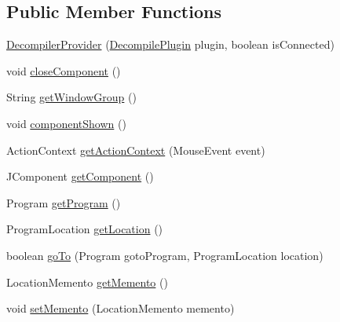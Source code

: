 \subsection*{Public Member Functions}
\begin{DoxyCompactItemize}
\item 
\mbox{\hyperlink{classghidra_1_1app_1_1plugin_1_1core_1_1decompile_1_1_decompiler_provider_abceef9c1daf26284a5931d893fea0683}{Decompiler\+Provider}} (\mbox{\hyperlink{classghidra_1_1app_1_1plugin_1_1core_1_1decompile_1_1_decompile_plugin}{Decompile\+Plugin}} plugin, boolean is\+Connected)
\item 
void \mbox{\hyperlink{classghidra_1_1app_1_1plugin_1_1core_1_1decompile_1_1_decompiler_provider_a0e2fcd2b85d7ae6fe189998b4bcdd984}{close\+Component}} ()
\item 
String \mbox{\hyperlink{classghidra_1_1app_1_1plugin_1_1core_1_1decompile_1_1_decompiler_provider_ad8024deb2b67ffdb4b70e4dcab3d8bee}{get\+Window\+Group}} ()
\item 
void \mbox{\hyperlink{classghidra_1_1app_1_1plugin_1_1core_1_1decompile_1_1_decompiler_provider_ad7dcdde0bae93b40f4d6acca9f90a139}{component\+Shown}} ()
\item 
Action\+Context \mbox{\hyperlink{classghidra_1_1app_1_1plugin_1_1core_1_1decompile_1_1_decompiler_provider_ab571e99016e4543a5b2d4992f524b239}{get\+Action\+Context}} (Mouse\+Event event)
\item 
J\+Component \mbox{\hyperlink{classghidra_1_1app_1_1plugin_1_1core_1_1decompile_1_1_decompiler_provider_a3a62ac0c1d62e3ce2999b5873f369105}{get\+Component}} ()
\item 
Program \mbox{\hyperlink{classghidra_1_1app_1_1plugin_1_1core_1_1decompile_1_1_decompiler_provider_a25d24b6b3dbbea0d5fca7d0aeabe70d0}{get\+Program}} ()
\item 
Program\+Location \mbox{\hyperlink{classghidra_1_1app_1_1plugin_1_1core_1_1decompile_1_1_decompiler_provider_a38fd2ce84b83587100a537a0349fc77f}{get\+Location}} ()
\item 
boolean \mbox{\hyperlink{classghidra_1_1app_1_1plugin_1_1core_1_1decompile_1_1_decompiler_provider_abc292f1da8451745af1bdeb21b005d81}{go\+To}} (Program goto\+Program, Program\+Location location)
\item 
Location\+Memento \mbox{\hyperlink{classghidra_1_1app_1_1plugin_1_1core_1_1decompile_1_1_decompiler_provider_a8e59155af3132b464c1c9e682a2d1fd7}{get\+Memento}} ()
\item 
void \mbox{\hyperlink{classghidra_1_1app_1_1plugin_1_1core_1_1decompile_1_1_decompiler_provider_a87f073c9afbb251f2ee4e6dfbb8b4884}{set\+Memento}} (Location\+Memento memento)

\end{DoxyCompactItemize}
